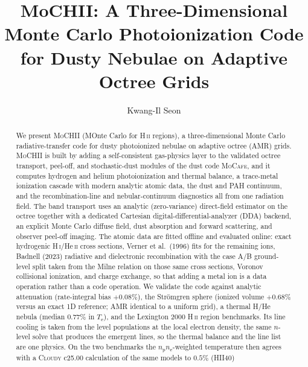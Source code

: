 \documentclass[twocolumn,linenumbers]{aastex702}
\newcommand{\MoCHII}{\textsc{MoCHII}}
\newcommand{\MoCafe}{\textsc{MoCafe}}
\newcommand{\HII}{H\,\textsc{ii}}
\newcommand{\HI}{H\,\textsc{i}}
\newcommand{\HeII}{He\,\textsc{ii}}
\newcommand{\Te}{T_{\mathrm{e}}}
\begin{document}
\title{MoCHII: A Three-Dimensional Monte Carlo Photoionization
Code for Dusty Nebulae on Adaptive Octree Grids}

\author[orcid=0000-0001-9561-8134,gname=Kwang-Il,sname=Seon]{Kwang-Il Seon}

\begin{abstract}
We present \MoCHII{} (MOnte Carlo for \HII{} regions), a
three-dimensional Monte Carlo radiative-transfer code for dusty
photoionized nebulae on adaptive octree (AMR) grids.  \MoCHII{} is built
by adding a self-consistent gas-physics layer to the validated octree
transport, peel-off, and stochastic-dust modules of the dust code
\MoCafe{}, and it computes hydrogen and helium photoionization and
thermal balance, a trace-metal ionization cascade with modern analytic
atomic data, the dust and PAH continuum, and the recombination-line and
nebular-continuum diagnostics all from one radiation field.  The band
transport uses an analytic (zero-variance) direct-field estimator on the
octree together with a dedicated Cartesian digital-differential-analyzer
(DDA) backend, an explicit Monte Carlo diffuse field, dust absorption and
forward scattering, and observer peel-off imaging.  The atomic data are
fitted offline and evaluated online: exact hydrogenic \HI/\HeII{} cross
sections, Verner et al.\ (1996) fits for the remaining ions, Badnell
(2023) radiative and dielectronic recombination with the case A/B
ground-level split taken from the Milne relation on those same cross
sections, Voronov collisional ionization,
and charge exchange, so that adding a metal ion is a data operation
rather than a code operation.  We validate the code against analytic
attenuation (rate-integral bias $+0.08\%$), the Str\"omgren sphere
(ionized volume $+0.68\%$ versus an exact 1D reference; AMR identical to
a uniform grid), a thermal H/He nebula (median $0.77\%$ in $\Te$), and
the Lexington 2000 \HII{} region benchmarks.  Its line cooling is taken
from the level populations at the local electron density, the same
$n$-level solve that produces the emergent lines, so the thermal balance
and the line list are one physics.  On the two benchmarks the
$n_{\mathrm{p}}n_{\mathrm{e}}$-weighted temperature then agrees with a
\textsc{Cloudy} c25.00 calculation of the same models to $0.5\%$ (HII40)

\end{abstract}
\end{document}
